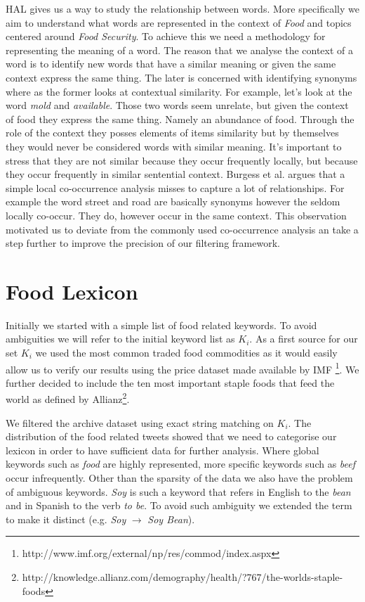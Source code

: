 HAL gives us a way to study the relationship between words.  More specifically we aim to understand what words are represented in the context of \emph{Food} and topics centered around \emph{Food Security}. To achieve this we need a methodology for representing the meaning of a word. The reason that we analyse the context of a word is to identify new words that have a similar meaning or given the same context express the same thing. The later is concerned with identifying synonyms where as the former looks at contextual similarity. For example, let's look at the word \emph {mold} and \emph {available}. Those two words seem unrelate, but given the context of food they express the same thing.  Namely an abundance of food. Through the role  of the context they posses elements of items similarity but by themselves they would never be considered words with similar meaning. It's important to stress that they are not similar because they occur frequently locally, but because they occur frequently in similar sentential context. Burgess et al. \cite{burgess98} argues that a simple local co-occurrence analysis misses to capture a lot of relationships. For example the word street and road are basically synonyms however the seldom locally co-occur. They do, however occur in the same context. This observation motivated us to deviate from the commonly used co-occurrence analysis an take a step further to improve the precision of our filtering framework. 




\section{Food Lexicon}

Initially we started with a simple list of food related keywords. To avoid ambiguities we will refer to the initial keyword list as $K_i$. As a first source for our set $K_i$ we used the most common traded food commodities as it would easily allow us to verify our results using the price dataset made available by IMF \footnote{http://www.imf.org/external/np/res/commod/index.aspx}. We further decided to include the ten most important staple foods that feed the world as defined by Allianz\footnote{http://knowledge.allianz.com/demography/health/?767/the-worlds-staple-foods}. 

We filtered the archive dataset using exact string matching on $K_i$. The distribution of the food related tweets showed that we need to categorise our lexicon in order to have sufficient data for further analysis. Where global keywords such as \emph{food} are highly represented, more specific keywords such as \emph{beef} occur infrequently. Other than the sparsity of the data we also have the problem of ambiguous keywords. \emph {Soy} is such a keyword that refers in English to the \emph{bean} and in Spanish to the verb \emph{to be}. To avoid such ambiguity we extended the term to make it distinct (e.g. \emph{Soy} $\to$  \emph{Soy Bean}). 

